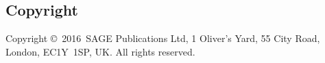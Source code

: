 \documentclass[Afour,times,sageh]{sagej}
\newcommand\BibTeX{{\rmfamily B\kern-.05em \textsc{i\kern-.025em b}\kern-.08em
T\kern-.1667em\lower.7ex\hbox{E}\kern-.125emX}}
\def\volumeyear{2016}
\begin{document}


%

%
\subsection{Copyright}
Copyright \copyright\ \volumeyear\ SAGE Publications Ltd,
1 Oliver's Yard, 55 City Road, London, EC1Y~1SP, UK. All
rights reserved.

\begin{acks}

\end{acks}
\end{document}
